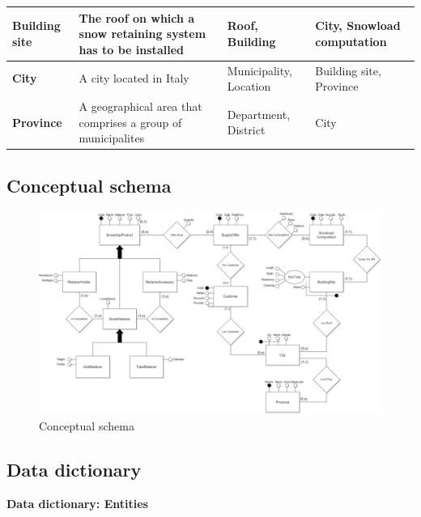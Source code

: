 \documentclass{article}[h]
\begin{document}
\begin{table}[H]
\begin{tabular}{ | m{3.5cm} | m{4cm}| m{3cm} | m{3cm} |}
    \hline
    \color[HTML]{3531FF} \textbf{Building site} & The roof on which a snow retaining system has to be installed & Roof, Building & City, Snowload computation \\ 
    \hline
    \color[HTML]{3531FF} \textbf{City} & A city located in Italy & Municipality, Location & Building site, Province \\ 
    \hline
    \color[HTML]{3531FF} \textbf{Province} & A geographical area that comprises a group of municipalites & Department, District & City \\ 
    \hline
  \end{tabular}
  \end{table}

\subsection{Conceptual schema}
\begin{figure}[H]
  \centering
  \includegraphics[scale=0.27, angle=270]{ConceptualSchema.jpg}
  \caption{Conceptual schema}
\end{figure}


\subsection{Data dictionary}

\vspace{12px}

{\centering \textbf{Data dictionary: Entities}\\}
\end{document}
